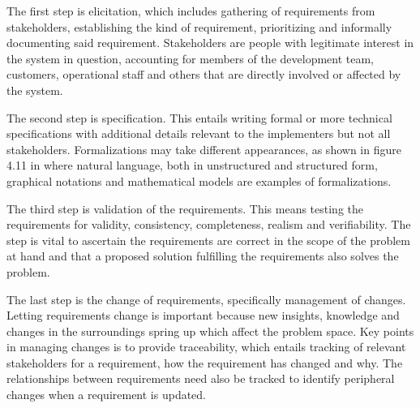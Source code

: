 The first step is elicitation, which includes gathering of
requirements from stakeholders, establishing the kind of
requirement, prioritizing and informally documenting said
requirement. Stakeholders are people with legitimate interest in
the system in question, accounting for members of the development
team, customers, operational staff and others that are directly
involved or affected by the system. 

The second step is specification. This entails writing formal or
more technical specifications with additional details relevant to
the implementers but not all stakeholders. Formalizations may take
different appearances, as shown in figure 4.11 in \cite{sommerville-software-engineering}
where natural language, both in unstructured and structured form,
graphical notations and mathematical models are examples of
formalizations.

The third step is validation of the requirements. This means
testing the requirements for validity, consistency, completeness,
realism and verifiability. The step is vital to ascertain the
requirements are correct in the scope of the problem at hand and
that a proposed solution fulfilling the requirements also solves
the problem.

The last step is the change of requirements, specifically
management of changes. Letting requirements change is important
because new insights, knowledge and changes in the surroundings
spring up which affect the problem space. Key points in managing
changes is to provide traceability, which entails tracking of
relevant stakeholders for a requirement, how the requirement has
changed and why. The relationships between requirements need also
be tracked to identify peripheral changes when a requirement is
updated.
